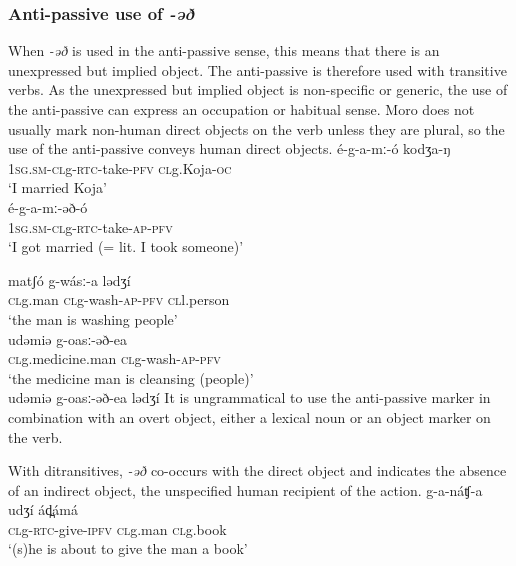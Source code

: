 \subsubsection{Anti-passive use of \textit{-əð}}
When \textit{-əð} is used in the anti-passive sense, this means that there is an unexpressed but implied object. The anti-passive is therefore used with transitive verbs. As the unexpressed but implied object is non-specific or generic, the use of the anti-passive can express an occupation or habitual sense. Moro does not usually mark non-human direct objects on the verb unless they are plural, so the use of the anti-passive conveys human direct objects.
\ea
\ea \gll 	é-g-a-mː-ó 			kodʒa-ŋ  \\
	1\textsc{sg.sm-cl}g-\textsc{rtc}-take-\textsc{pfv}	\textsc{cl}g.Koja-\textsc{oc}\\
	\glt ‘I married Koja’\\

\ex \gll	é-g-a-mː-əð-ó  \\
	1\textsc{sg.sm-cl}g-\textsc{rtc}-take-\textsc{ap-\textsc{pfv}}	 \\
	\glt ‘I got married (= lit.  I took someone)’\\
\z
\z

\ea
\ea \gll	matʃó 		g-wásː-a 		lədʒí	\\
	\textsc{cl}g.man	\textsc{cl}g-wash-\textsc{ap-\textsc{pfv}}	\textsc{cl}l.person	\\
	\glt ‘the man is washing people’\\

\ex \gll	udəmiə 			g-oasː-əð-ea\\
		\textsc{cl}g.medicine.man	\textsc{cl}g-wash-\textsc{ap-\textsc{pfv}}		\\
	\glt ‘the medicine man is cleansing (people)’\\

\ex	* udəmiə g-oasː-əð-ea lədʒí
\z
\z
It is ungrammatical to use the anti-passive marker in combination with an overt object, either a lexical noun or an object marker on the verb. 

With ditransitives, \textit{-əð} co-occurs with the direct object and indicates the absence of an indirect object, the unspecified human recipient of the action.
\ea
\ea \gll	g-a-náʧ-a 			udʒí 		ád̪ámá  \\
	\textsc{cl}g-\textsc{rtc}-give-\textsc{ipfv}	\textsc{cl}g.man	\textsc{cl}g.book  \\
	\glt ‘(s)he is about to give the man a book’\\

